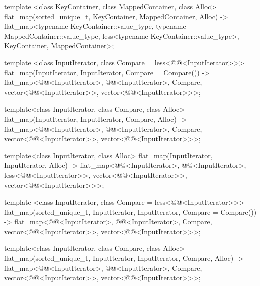 \begin{codeblock}
\begin{codeblock}
\begin{codeblock}
\begin{addedblock}
\begin{codeblock}
{  template <class KeyContainer, class MappedContainer, class Alloc>
    flat_map(sorted_unique_t, KeyContainer, MappedContainer, Alloc)
      -> flat_map<typename KeyContainer::value_type,
                  typename MappedContainer::value_type,
                  less<typename KeyContainer::value_type>,
                  KeyContainer, MappedContainer>;

  template <class InputIterator, class Compare = less<@@<InputIterator>>>
    flat_map(InputIterator, InputIterator, Compare = Compare())
      -> flat_map<@@<InputIterator>, @@<InputIterator>, Compare,
                  vector<@@<InputIterator>>,
                  vector<@@<InputIterator>>>;

  template<class InputIterator, class Compare, class Alloc>
    flat_map(InputIterator, InputIterator, Compare, Alloc)
      -> flat_map<@@<InputIterator>, @@<InputIterator>, Compare,
                  vector<@@<InputIterator>>,
                  vector<@@<InputIterator>>>;

  template<class InputIterator, class Alloc>
    flat_map(InputIterator, InputIterator, Alloc)
      -> flat_map<@@<InputIterator>, @@<InputIterator>,
                  less<@@<InputIterator>>,
                  vector<@@<InputIterator>>,
                  vector<@@<InputIterator>>>;

  template <class InputIterator, class Compare = less<@@<InputIterator>>>
    flat_map(sorted_unique_t, InputIterator, InputIterator, Compare = Compare())
      -> flat_map<@@<InputIterator>, @@<InputIterator>, Compare,
                  vector<@@<InputIterator>>,
                  vector<@@<InputIterator>>>;

  template<class InputIterator, class Compare, class Alloc>
    flat_map(sorted_unique_t, InputIterator, InputIterator, Compare, Alloc)
      -> flat_map<@@<InputIterator>, @@<InputIterator>, Compare,
                  vector<@@<InputIterator>>,
                  vector<@@<InputIterator>>>;

}
\end{codeblock}
\end{addedblock}
\end{codeblock}
\end{codeblock}
\end{codeblock}

